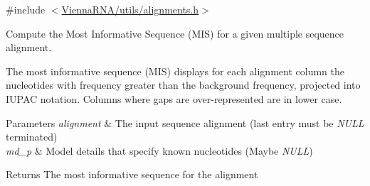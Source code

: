 {\ttfamily \#include $<$\mbox{\hyperlink{utils_2alignments_8h}{Vienna\+R\+N\+A/utils/alignments.\+h}}$>$}



Compute the Most Informative Sequence (M\+IS) for a given multiple sequence alignment. 

The most informative sequence (M\+IS) \cite{freyhult:2005} displays for each alignment column the nucleotides with frequency greater than the background frequency, projected into I\+U\+P\+AC notation. Columns where gaps are over-\/represented are in lower case.


\begin{DoxyParams}{Parameters}
{\em alignment} & The input sequence alignment (last entry must be {\itshape N\+U\+LL} terminated) \\
\hline
{\em md\+\_\+p} & Model details that specify known nucleotides (Maybe {\itshape N\+U\+LL}) \\
\hline
\end{DoxyParams}
\begin{DoxyReturn}{Returns}
The most informative sequence for the alignment 
\end{DoxyReturn}

